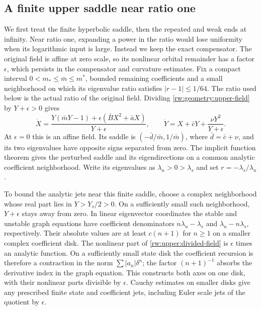 \subsection{A finite upper saddle near ratio one}\label{rw:upper-resonance}

We first treat the finite hyperbolic saddle, then the repeated and weak
ends at infinity.  Near ratio one, expanding a power in the ratio
would lose uniformity when its logarithmic input is large.  Instead
we keep the exact compensator.  The original field is affine at zero
scale, so its nonlinear orbital remainder has a factor $\epsilon$,
which persists in the compensator and curvature estimates.  Fix a compact
interval $0<m_*\le\bar m\le m^*$, bounded remaining coefficients and a
small neighborhood on which its eigenvalue ratio satisfies
$|r-1|\le1/64$. The ratio used below is the actual ratio of the original
field. Dividing \eqref{rw:geometry:upper-field} by $Y+\epsilon>0$ gives
\begin{equation}\label{rw:upper:divided-field}
 \dot X=\frac{Y(\bar mY-1)+\epsilon(\bar BX^2+\bar aX)}{Y+\epsilon},
 \qquad
 \dot Y=X+\bar cY+\frac{\nu Y^2}{Y+\epsilon}.
\end{equation}
At $\epsilon=0$ this is an affine field. Its saddle is
$(-\bar d/\bar m,1/\bar m)$, where $\bar d=\bar c+\nu$, and its two
eigenvalues have opposite signs separated from zero. The implicit
function theorem gives the perturbed saddle and its eigendirections on
a common analytic coefficient neighborhood. Write its eigenvalues as
$\lambda_u>0>\lambda_s$ and set $r=-\lambda_s/\lambda_u$.

To bound the analytic jets near this finite saddle, choose a complex
neighborhood whose real part lies in $Y>Y_s/2>0$.  On a sufficiently
small such neighborhood, $Y+\epsilon$ stays away from zero.  In linear
eigenvector coordinates the stable and unstable graph equations have
coefficient denominators $n\lambda_u-\lambda_s$ and
$\lambda_u-n\lambda_s$, respectively. Their absolute values are at
least $c(n+1)$ for $n\ge1$ on a smaller complex coefficient disk.
The nonlinear part of \eqref{rw:upper:divided-field} is $\epsilon$
times an analytic function. On a sufficiently small state disk the
coefficient recursion is therefore a contraction in the norm
$\sum|a_n|\delta^n$; the factor $(n+1)^{-1}$ absorbs the derivative
index in the graph equation. This constructs both axes on one disk,
with their nonlinear parts divisible by $\epsilon$. Cauchy estimates
on smaller disks give any prescribed finite state and coefficient jets,
including Euler scale jets of the quotient by $\epsilon$.

